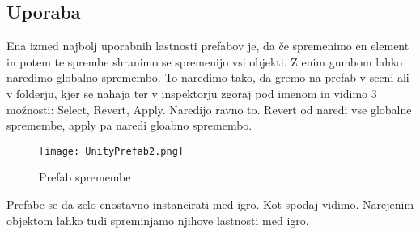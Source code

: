 {\color{indiagreen}\subsection{Uporaba}}
Ena izmed najbolj uporabnih lastnosti prefabov je, da če spremenimo en element in potem te sprembe shranimo se spremenijo vsi objekti. Z enim gumbom lahko naredimo globalno spremembo. To naredimo tako, da gremo na prefab v sceni ali v folderju, kjer se nahaja ter v inspektorju zgoraj pod imenom in vidimo 3 možnosti: Select, Revert, Apply. Naredijo ravno to. Revert od naredi vse globalne spremembe, apply pa naredi gloabno spremembo.
\begin{figure}[ht!]
	\centering
	\texttt{[image: UnityPrefab2.png]}
	\caption{Prefab spremembe}
\end{figure}
Prefabe se da zelo enostavno instancirati med igro. Kot spodaj vidimo. Narejenim objektom lahko tudi spreminjamo njihove lastnosti med igro.
